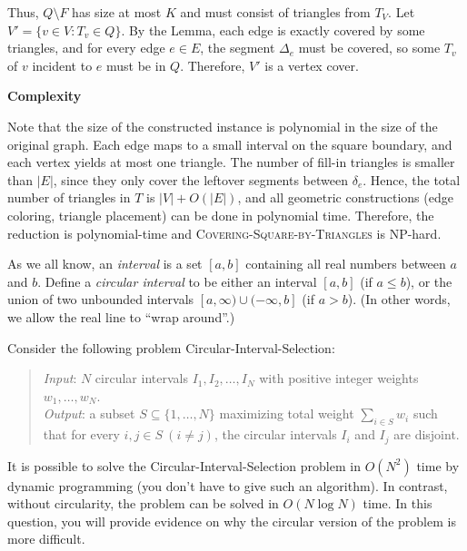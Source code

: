 \documentclass[11pt]{article}
\begin{document}
\begin{description}
Thus, $Q \setminus F$ has size at most $K$ and must consist of triangles from $T_V$. Let $V' = \{v \in V : T_v \in Q\}$. By the Lemma, each edge is exactly covered by some triangles, and for every edge $e \in E$, the segment $\Delta_e$ must be covered, so some $T_v$ of $v$ incident to $e$ must be in $Q$. Therefore, $V'$ is a vertex cover.

\textbf{Complexity}

Note that the size of the constructed instance is polynomial in the size of the original graph. Each edge maps to a small interval on the square boundary, and each vertex yields at most one triangle. The number of fill-in triangles is smaller than $|E|$, since they only cover the leftover segments between $\delta_e$. Hence, the total number of triangles in $T$ is $|V| + O(|E|)$, and all geometric constructions (edge coloring, triangle placement) can be done in polynomial time. Therefore, the reduction is polynomial-time and \textsc{ Covering-Square-by-Triangles} is NP-hard.







\newpage
\item[Problem 9.3:]
As we all know, an \emph{interval} is a set $[a,b]$ containing all real numbers between $a$ and $b$.
Define a \emph{circular interval} to be either an interval $[a,b]$ (if $a\le b$),
or the union of two unbounded intervals $[a,\infty)\cup (-\infty,b]$ (if $a>b$).
(In other words, we allow the real line to ``wrap around''.)

Consider the following problem {\sc Circular-Interval-Selection}:
\begin{quote}
\emph{Input}: $N$ circular intervals $I_1,I_2,\ldots,I_N$ with positive integer weights $w_1,\ldots,w_N$.\\[2pt]
\emph{Output}: a subset $S\subseteq \{1,\ldots,N\}$ maximizing total weight $\sum_{i\in S}w_i$
such that for every $i,j\in S\ (i\neq j)$, the circular intervals $I_i$ and $I_j$ are disjoint.
\end{quote}

It is possible to solve the {\sc Circular-Interval-Selection} problem in $O(N^2)$ time by
dynamic programming (you don't have to give such an algorithm).  In contrast, without circularity, the problem can
be solved in $O(N\log N)$ time.  In this question, you will provide evidence on why the circular
version of the problem is more difficult.


\end{description}
\end{document}
